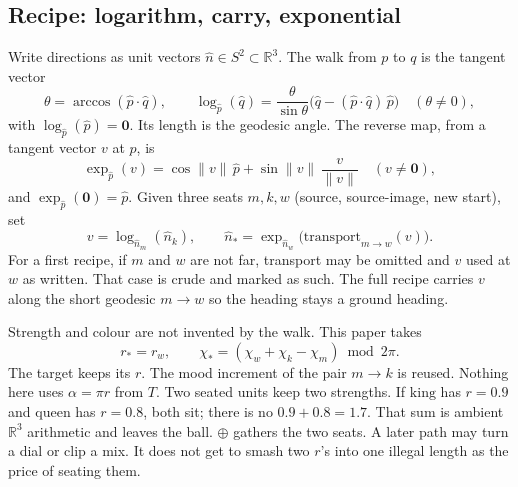 \documentclass[12pt, a4paper]{article}
\begin{document}
\subsection{Recipe: logarithm, carry, exponential}
\label{subsec:offset_logexp}
Write directions as unit vectors $\hat n\in S^2\subset\mathbb{R}^3$.
The walk from $p$ to $q$ is the tangent vector
\begin{equation}
    \theta = \arccos(\hat p\cdot\hat q),
    \qquad
    \log_{\hat p}(\hat q)
    = \frac{\theta}{\sin\theta}\bigl(\hat q-(\hat p\cdot\hat q)\,\hat p\bigr)
    \quad (\theta\neq 0),
    \label{eq:sphere_log}
\end{equation}
with $\log_{\hat p}(\hat p)=\mathbf{0}$. Its length is the geodesic
angle. The reverse map, from a tangent vector $v$ at $p$, is
\begin{equation}
    \exp_{\hat p}(v)
    = \cos\|v\|\,\hat p + \sin\|v\|\,\frac{v}{\|v\|}
    \quad (v\neq\mathbf{0}),
    \label{eq:sphere_exp}
\end{equation}
and $\exp_{\hat p}(\mathbf{0})=\hat p$. Given three seats
$m,k,w$ (source, source-image, new start), set
\begin{equation}
    v = \log_{\hat n_m}(\hat n_k),
    \qquad
    \hat n_{*}
    = \exp_{\hat n_w}\bigl(\mathrm{transport}_{m\to w}(v)\bigr).
    \label{eq:analogical_offset}
\end{equation}
For a first recipe, if $m$ and $w$ are not far, transport may be
omitted and $v$ used at $w$ as written. That case is crude and
marked as such. The full recipe carries $v$ along the short geodesic
$m\to w$ so the heading stays a ground heading.

Strength and colour are not invented by the walk. This paper takes
\begin{equation}
    r_{*}=r_w,
    \qquad
    \chi_{*}=(\chi_w+\chi_k-\chi_m)\bmod 2\pi.
    \label{eq:offset_rchi}
\end{equation}
The target keeps its $r$. The mood increment of the pair $m\to k$
is reused. Nothing here uses $\alpha=\pi r$ from $T$.
Two seated units keep two strengths. If $\mathrm{king}$ has $r=0.9$
and $\mathrm{queen}$ has $r=0.8$, both sit; there is no
$0.9+0.8=1.7$. That sum is ambient $\mathbb{R}^3$ arithmetic and
leaves the ball. $\oplus$ gathers the two seats. A later path may
turn a dial or clip a mix. It does not get to smash two $r$'s into
one illegal length as the price of seating them.
\end{document}
